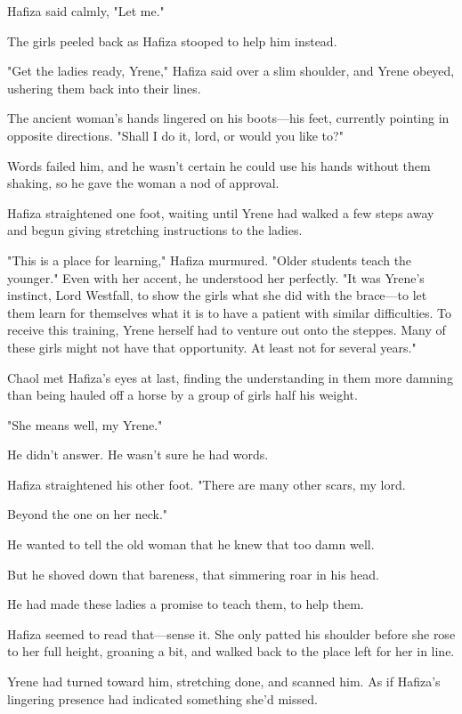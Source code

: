 Hafiza said calmly, "Let me."

The girls peeled back as Hafiza stooped to help him instead.

"Get the ladies ready, Yrene," Hafiza said over a slim shoulder, and Yrene obeyed, ushering them back into their lines.

The ancient woman's hands lingered on his boots---his feet, currently pointing in opposite directions.
"Shall I do it, lord, or would you like to?"

Words failed him, and he wasn't certain he could use his hands without them shaking, so he gave the woman a nod of approval.

Hafiza straightened one foot, waiting until Yrene had walked a few steps away and begun giving stretching instructions to the ladies.

"This is a place for learning," Hafiza murmured.
"Older students teach the younger."
Even with her accent, he understood her perfectly.
"It was Yrene's instinct, Lord Westfall, to show the girls what she did with the brace---to let them learn for themselves what it is to have a patient with similar difficulties.
To receive this training, Yrene herself had to venture out onto the steppes.
Many of these girls might not have that opportunity.
At least not for several years."

Chaol met Hafiza's eyes at last, finding the understanding in them more damning than being hauled off a horse by a group of girls half his weight.

"She means well, my Yrene."

He didn't answer.
He wasn't sure he had words.

Hafiza straightened his other foot.
"There are many other scars, my lord.

Beyond the one on her neck."

He wanted to tell the old woman that he knew that too damn well.

But he shoved down that bareness, that simmering roar in his head.

He had made these ladies a promise to teach them, to help them.

Hafiza seemed to read that---sense it.
She only patted his shoulder before she rose to her full height, groaning a bit, and walked back to the place left for her in line.

Yrene had turned toward him, stretching done, and scanned him.
As if Hafiza's lingering presence had indicated something she'd missed.

